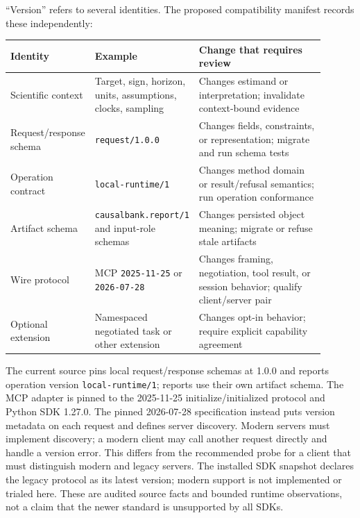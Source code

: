 “Version” refers to several identities. The proposed compatibility manifest
records these independently:
\begin{center}
\begin{tabular}{P{0.19\linewidth}P{0.28\linewidth}P{0.43\linewidth}}
\hline
Identity & Example & Change that requires review\\
\hline
Scientific context & Target, sign, horizon, units, assumptions, clocks, sampling & Changes estimand or interpretation; invalidate context-bound evidence\\
Request/response schema & \texttt{request/1.0.0} & Changes fields, constraints, or representation; migrate and run schema tests\\
Operation contract & \texttt{local-runtime/1} & Changes method domain or result/refusal semantics; run operation conformance\\
Artifact schema & \texttt{causalbank.report/1} and input-role schemas & Changes persisted object meaning; migrate or refuse stale artifacts\\
Wire protocol & MCP \texttt{2025-11-25} or \texttt{2026-07-28} & Changes framing, negotiation, tool result, or session behavior; qualify client/server pair\\
Optional extension & Namespaced negotiated task or other extension & Changes opt-in behavior; require explicit capability agreement\\
\hline
\end{tabular}
\end{center}

The current source pins local request/response schemas at 1.0.0 and reports
operation version \texttt{local-runtime/1}; reports use their own artifact
schema. The MCP adapter is pinned to the 2025-11-25 initialize/initialized
protocol and Python SDK 1.27.0. The pinned 2026-07-28 specification instead
puts version metadata on each request and defines server discovery. Modern
servers must implement discovery; a modern client may call another request
directly and handle a version error. This differs from the recommended probe
for a client that must distinguish modern and legacy servers. The
installed SDK snapshot declares the legacy protocol as its latest version;
modern support is not implemented or trialed here. These are audited source
facts and bounded runtime observations, not a claim that the newer standard is
unsupported by all SDKs.~\citep{v12_mcp_legacy_lifecycle,v12_mcp_versioning,v12_mcp_basic,v12_mcp_stdio,exec16_parity_observed}

